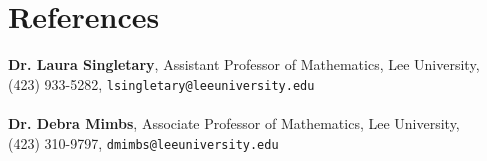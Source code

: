 \section{\sc References}

{\bf Dr. Laura Singletary}, Assistant Professor of Mathematics, Lee University,\\ (423) 933-5282, \texttt{lsingletary@leeuniversity.edu}\\
\vspace{.025in}\\
{\bf Dr. Debra Mimbs}, Associate Professor of Mathematics, Lee University, \\(423) 310-9797, \texttt{dmimbs@leeuniversity.edu}\\

\endinput